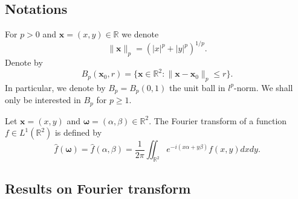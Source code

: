 \documentclass{amsart}
\numberwithin{equation}{section}
\begin{document}
\subsection{Notations} 
For $p>0$ and $\boldsymbol{x}=(x,y)\in\mathbb{R}$ we denote 
$$
\|\boldsymbol{x}\|_p=\left(|x|^p+|y|^p\right)^{1/p}.
$$
Denote by 
$$
B_p(\boldsymbol{x}_0,r)=\{\boldsymbol{x}\in\mathbb{R}^2:\|\boldsymbol{x}-\boldsymbol{x}_0\|_p\le r\}.
$$
In particular, we denote by $B_p=B_p(0,1)$ the unit ball in $l^p$-norm. We shall only be interested in $B_p$ for $p\ge1$.

Let $\boldsymbol{x}=(x,y)$ and $\boldsymbol{\omega}=(\alpha,\beta)\in\mathbb{R}^2$. The Fourier transform of a function $f\in L^1(\mathbb{R}^2)$ is defined by
\begin{equation}
    \label{fourierDef}
    \widehat{f}(\boldsymbol{\omega})=\widehat{f}(\alpha,\beta)=\frac{1}{2\pi}\iint_{\mathbb{R}^2}e^{-i(x\alpha+y\beta)}f(x,y)dxdy.
\end{equation}
\subsection{Results on Fourier transform}
\end{document}
